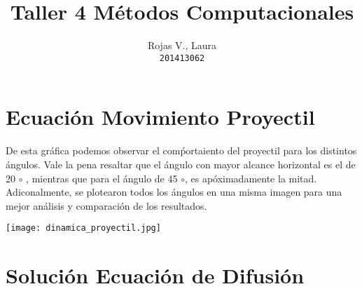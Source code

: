 \documentclass{article}
\title{\vspace{-15mm}\fontsize{20pt}{12pt}\selectfont\textbf{Taller 4 Métodos Computacionales}}
\date{\vspace{-5ex}}
\author{
    Rojas V., Laura  \\
  \texttt{201413062}
  }
\begin{document}
\maketitle
\thispagestyle{fancy}


\section{Ecuación Movimiento Proyectil}

De esta gráfica podemos observar el comṕortaiento del proyectil para los distintos ángulos. Vale la pena resaltar que el ángulo con mayor alcance horizontal es el de 20 $\circ$ , mientras que para el ángulo de 45 $\circ$, es apóximadamente la mitad. Adiconalmente, se plotearon todos los ángulos en una misma imagen para una mejor análisis y comparación de los resultados.

{
\texttt{[image: dinamica\_proyectil.jpg]}
}


\section{Solución Ecuación de Difusión}
\end{document}
